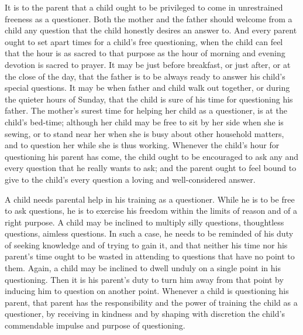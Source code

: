 \documentclass[
]{book}
\begin{document}
It is to the parent that a child ought to be privileged to come in unrestrained freeness as a questioner. Both the mother and the father should welcome from a child any question that the child honestly desires an answer to. And every parent ought to set apart times for a child's free questioning, when the child can feel that the hour is as sacred to that purpose as the hour of morning and evening devotion is sacred to prayer. It may be just before breakfast, or just after, or at the close of the day, that the father is to be always ready to answer his child's special questions. It may be when father and child walk out together, or during the quieter hours of Sunday, that the child is sure of his time for questioning his father. The mother's surest time for helping her child as a questioner, is at the child's bed-time; although her child may be free to sit by her side when she is sewing, or to stand near her when she is busy about other household matters, and to question her while she is thus working. Whenever the child's hour for questioning his parent has come, the child ought to be encouraged to ask any and every question that he really wants to ask; and the parent ought to feel bound to give to the child's every question a loving and well-considered answer.

A child needs parental help in his training as a questioner. While he is to be free to ask questions, he is to exercise his freedom within the limits of reason and of a right purpose. A child may be inclined to multiply silly questions, thoughtless questions, aimless questions. In such a case, he needs to be reminded of his duty of seeking knowledge and of trying to gain it, and that neither his time nor his parent's time ought to be wasted in attending to questions that have no point to them. Again, a child may be inclined to dwell unduly on a single point in his questioning. Then it is his parent's duty to turn him away from that point by inducing him to question on another point. Whenever a child is questioning his parent, that parent has the responsibility and the power of training the child as a questioner, by receiving in kindness and by shaping with discretion the child's commendable impulse and purpose of questioning.
\end{document}
